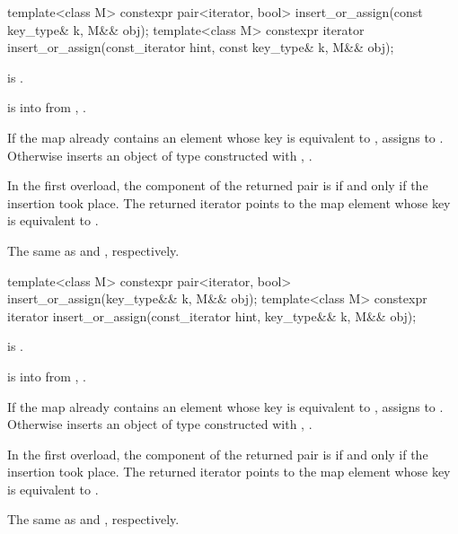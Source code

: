 %
\begin{itemdecl}
template<class M>
  constexpr pair<iterator, bool> insert_or_assign(const key_type& k, M&& obj);
template<class M>
  constexpr iterator insert_or_assign(const_iterator hint, const key_type& k, M&& obj);
\end{itemdecl}

\begin{itemdescr}
\pnum
\mandates
{} is .

\pnum
\expects
{} is  into 
from , .

\pnum
\effects
If the map already contains an element 
whose key is equivalent to ,
assigns  to .
Otherwise inserts an object of type 
constructed with , .

\pnum
\returns
In the first overload,
the  component of the returned pair is 
if and only if the insertion took place.
The returned iterator points to the map element
whose key is equivalent to .

\pnum
\complexity
The same as  and ,
respectively.
\end{itemdescr}

%
\begin{itemdecl}
template<class M>
  constexpr pair<iterator, bool> insert_or_assign(key_type&& k, M&& obj);
template<class M>
  constexpr iterator insert_or_assign(const_iterator hint, key_type&& k, M&& obj);
\end{itemdecl}

\begin{itemdescr}
\pnum
\mandates
{} is .

\pnum
\expects
{} is  into 
from , .

\pnum
\effects
If the map already contains an element 
whose key is equivalent to ,
assigns  to .
Otherwise inserts an object of type 
constructed with , .

\pnum
\returns
In the first overload,
the  component of the returned pair is 
if and only if the insertion took place.
The returned iterator points to the map element
whose key is equivalent to .

\pnum
\complexity
The same as  and ,
respectively.
\end{itemdescr}

